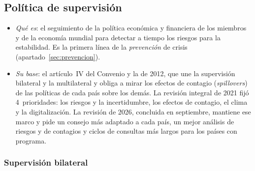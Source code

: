 \documentclass[11pt]{article}
\begin{document}
\begin{infografia}[p]
\centering
\caption{Las políticas del FMI: supervisión, préstamo y asistencia técnica, unidas por la condicionalidad}\label{figu:politicas}
\end{infografia}

\subsection{Política de supervisión}\label{sec:supervision}

\begin{itemize}
\item \emph{Qué es}: el seguimiento de la política económica y financiera de los miembros y de la economía mundial para detectar a tiempo los riesgos para la estabilidad. Es la primera línea de la \emph{prevención} de crisis (apartado~\ref{sec:prevencion}).
\item \emph{Su base}: el artículo~IV del Convenio y la  de 2012, que une la supervisión bilateral y la multilateral y obliga a mirar los efectos de contagio (\emph{spillovers}) de las políticas de cada país sobre los demás\nocite{FMI2012ISD}. La revisión integral de 2021 fijó 4~prioridades: los riesgos y la incertidumbre, los efectos de contagio, el clima y la digitalización\nocite{FMI2021CSR}. La revisión de 2026, concluida en septiembre, mantiene ese marco y pide un consejo más adaptado a cada país, un mejor análisis de riesgos y de contagios y ciclos de consultas más largos para los países con programa\nocite{FMI2026CSR}.
\end{itemize}

\subsubsection{Supervisión bilateral}\label{sec:bilateral}
\end{document}
